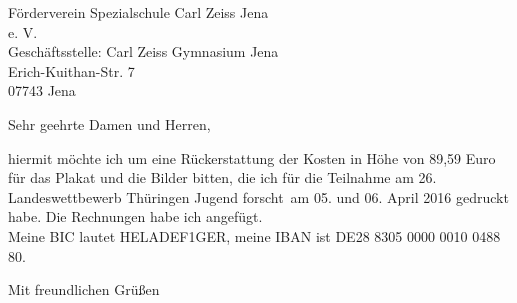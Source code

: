 \documentclass[parskip=full,fromalign=left,fromemail=true]{scrlttr2}
\begin{document}
\begin{letter}{Förderverein \glqq Spezialschule Carl Zeiss Jena\grqq \\e. V.\\
		  Geschäftsstelle: Carl Zeiss Gymnasium Jena\\
		  Erich-Kuithan-Str. 7\\
		  07743 Jena}
\opening{Sehr geehrte Damen und Herren,}
hiermit möchte ich um eine Rückerstattung der Kosten in Höhe von 89,59 Euro für das Plakat und die Bilder bitten, die ich für die Teilnahme am 26. Landeswettbewerb Thüringen \glqq Jugend forscht\grqq ~am 05. und 06. April 2016 gedruckt habe. Die Rechnungen habe ich angefügt.\\
Meine BIC lautet \glqq HELADEF1GER\grqq , meine IBAN ist \glqq DE28 8305 0000 0010 0488 80\grqq.
\closing{Mit freundlichen Grüßen}
\end{letter}
\end{document}
